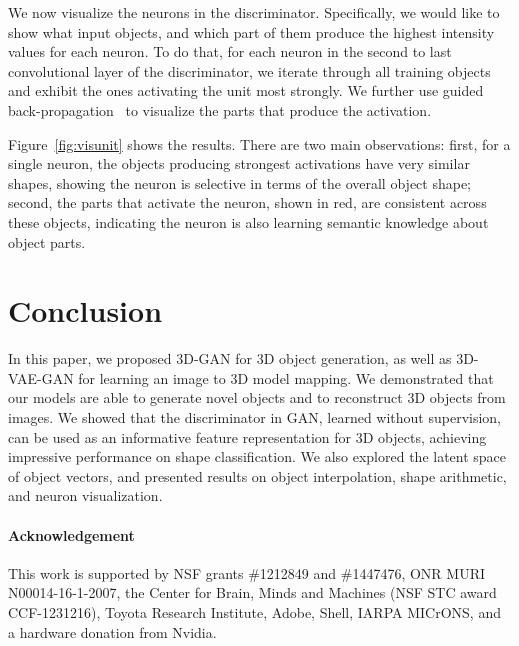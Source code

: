 \documentclass{article}
\newcommand{\fig}[1]{Figure~\ref{#1}}
\newcommand{\model}{3D-GAN\xspace}
\newcommand{\vaemodel}{3D-VAE-GAN\xspace}
\newcommand{\presection}{\vspace{-8pt}}
\newcommand{\postsection}{\vspace{-8pt}}
\begin{document}
We now visualize the neurons in the discriminator. Specifically, we would like to show what input objects, 
and which part of them produce the highest intensity values for each neuron. To do that, for each neuron in the second to last convolutional layer of the discriminator, we iterate through all training objects and exhibit the ones activating the unit most strongly. We further use guided back-propagation~\citep{springenberg2014striving} to visualize the parts that produce the activation. 

\fig{fig:visunit} shows the results. There are two main observations: first, for a single neuron, the objects producing strongest activations have very similar shapes, showing the neuron is selective in terms of the overall object shape; second, the parts that activate the neuron, shown in red, are consistent across these objects, indicating the neuron is also learning semantic knowledge about object parts.


\presection
\section{Conclusion}
\postsection

In this paper, we proposed \model for 3D object generation, as well as \vaemodel for learning an image to 3D model mapping. We demonstrated that our models are able to generate novel objects and to reconstruct 3D objects from images. We showed that the discriminator in GAN, learned without supervision, can be used as an informative feature representation for 3D objects, achieving impressive performance on shape classification. We also explored the latent space of object vectors, and presented results on object interpolation, shape arithmetic, and neuron visualization.

\presection
\paragraph{Acknowledgement} This work is supported by NSF grants \#1212849 and \#1447476, ONR MURI N00014-16-1-2007, the Center for Brain, Minds and Machines (NSF STC award CCF-1231216), Toyota Research Institute, Adobe, Shell, IARPA MICrONS, and a hardware donation from Nvidia. 
\postsection{\small
\setlength{\bibsep}{0pt}


}

\newpage
\appendix
\renewcommand{\thesection}{A.\arabic{section}}
\renewcommand{\thefigure}{A\arabic{figure}}
\setcounter{section}{0}
\setcounter{figure}{0}
\end{document}
